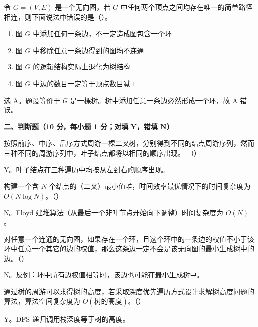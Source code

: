 \begin{question}
令 $G=(V,E)$ 是一个无向图，若 $G$ 中任何两个顶点之间均存在唯一的简单路径相连，则下面说法中错误的是（\quad）。
\begin{enumerate}
  \item 图 $G$ 中添加任何一条边，不一定造成图包含一个环
  \item 图 $G$ 中移除任意一条边得到的图均不连通
  \item 图 $G$ 的逻辑结构实际上退化为树结构
  \item 图 $G$ 中边的数目一定等于顶点数目减 $1$
\end{enumerate}
\begin{solution}
选 A。题设等价于 $G$ 是一棵树。树中添加任意一条边必然形成一个环，故 A 错误。
\end{solution}
\end{question}

\clearpage

\textbf{二、判断题（10 分，每小题 1 分；对填 Y，错填 N）}

\begin{question}
按照前序、中序、后序方式周游一棵二叉树，分别得到不同的结点周游序列，然而三种不同的周游序列中，叶子结点都将以相同的顺序出现。 （\quad）
\begin{solution}
Y。叶子结点在三种遍历中均按从左到右的顺序出现。
\end{solution}
\end{question}

\begin{question}
构建一个含 $N$ 个结点的（二叉）最小值堆，时间效率最优情况下的时间复杂度为 $O(N\log N)$。（\quad）
\begin{solution}
N。Floyd 建堆算法（从最后一个非叶节点开始向下调整）时间复杂度为 $O(N)$。
\end{solution}
\end{question}

\begin{question}
对任意一个连通的无向图，如果存在一个环，且这个环中的一条边的权值不小于该环中任意一个其它的边的权值，那么这条边一定不会是该无向图的最小生成树中的边。（\quad）
\begin{solution}
N。反例：环中所有边权值相等时，该边也可能在最小生成树中。
\end{solution}
\end{question}

\begin{question}
通过树的周游可以求得树的高度，若采取深度优先遍历方式设计求解树高度问题的算法，算法空间复杂度为 $O(\text{树的高度})$。（\quad）
\begin{solution}
Y。DFS 递归调用栈深度等于树的高度。
\end{solution}
\end{question}

